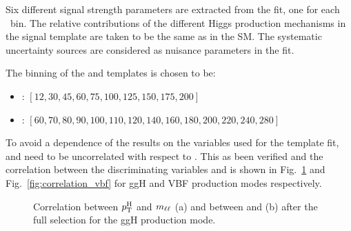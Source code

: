 Six different signal strength parameters are extracted from the fit, one for each \pth~bin. The relative contributions of the different Higgs production mechanisms in the signal template are taken to be the same as in the SM. The systematic uncertainty sources are considered as nuisance parameters in the fit.

The binning of the \mll and \mt templates is chosen to be:
\begin{itemize}
\item {\mll: $[12,30,45,60,75,100,125,150,175,200]$} 
\item {\mt: $[60,70,80,90,100,110,120,140,160,180,200,220,240,280]$}
\end{itemize}

To avoid a dependence of the results on the variables used for the template fit, \mll and \mt need to be uncorrelated with respect to \pth.
This as been verified and the correlation between the discriminating variables and \pth is shown in Fig.~\ref{fig:correlation_ggH} and Fig.~\ref{fig:correlation_vbf} for ggH and VBF production modes respectively.

\begin{figure}[htb]
\centering
{}
\caption{Correlation between $p_\mathrm{T}^\mathrm{H}$ and $m_{\ell\ell}$ (a) and between \pth and \mt (b) after the full selection for the ggH production mode.\label{fig:correlation_ggH}}
\end{figure}

